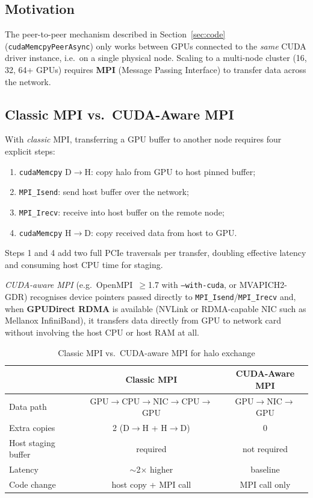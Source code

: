 \documentclass[conference]{IEEEtran}
\begin{document}
\subsection{Motivation}

The peer-to-peer mechanism described in Section~\ref{sec:code}
(\texttt{cudaMemcpyPeerAsync}) only works between GPUs connected to the
\emph{same} CUDA driver instance, i.e.\ on a single physical node.
Scaling to a multi-node cluster (16, 32, 64+ GPUs) requires
\textbf{MPI} (Message Passing Interface) to transfer data across the network.

\subsection{Classic MPI vs.\ CUDA-Aware MPI}

With \emph{classic} MPI, transferring a GPU buffer to another node requires
four explicit steps:
\begin{enumerate}
  \item \texttt{cudaMemcpy} D$\to$H: copy halo from GPU to host pinned buffer;
  \item \texttt{MPI\_Isend}: send host buffer over the network;
  \item \texttt{MPI\_Irecv}: receive into host buffer on the remote node;
  \item \texttt{cudaMemcpy} H$\to$D: copy received data from host to GPU.
\end{enumerate}
Steps 1 and 4 add two full PCIe traversals per transfer, doubling effective
latency and consuming host CPU time for staging.

\emph{CUDA-aware MPI} (e.g.\ OpenMPI~$\ge$1.7 with \texttt{--with-cuda}, or
MVAPICH2-GDR) recognises device pointers passed directly to
\texttt{MPI\_Isend}/\texttt{MPI\_Irecv} and, when \textbf{GPUDirect RDMA}
is available (NVLink or RDMA-capable NIC such as Mellanox InfiniBand), it
transfers data directly from GPU to network card without involving the host
CPU or host RAM at all.

\begin{table}[ht]
  \caption{Classic MPI vs.\ CUDA-aware MPI for halo exchange}
  \label{tab:mpi}
  \centering
  \begin{tabular}{lcc}
    \toprule
    & Classic MPI & CUDA-Aware MPI \\
    \midrule
    Data path     & GPU$\to$CPU$\to$NIC$\to$CPU$\to$GPU & GPU$\to$NIC$\to$GPU \\
    Extra copies  & 2 (D$\to$H + H$\to$D) & 0 \\
    Host staging buffer & required & not required \\
    Latency       & $\sim$2$\times$ higher & baseline \\
    Code change   & host copy + MPI call & MPI call only \\
    \bottomrule
  \end{tabular}
\end{table}
\end{document}

